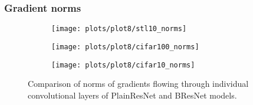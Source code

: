     \subsubsection*{Gradient norms}
    \begin{figure}[h!]
        \centering
        \begin{subfigure}{0.7\textwidth}
            \texttt{[image: plots/plot8/stl10\_norms]}
        \end{subfigure}
        \begin{subfigure}{0.7\textwidth}
            \texttt{[image: plots/plot8/cifar100\_norms]}
        \end{subfigure}
        \begin{subfigure}{0.7\textwidth}
            \texttt{[image: plots/plot8/cifar10\_norms]}
        \end{subfigure}
        \caption{Comparison of norms of gradients flowing through individual
            convolutional layers of PlainResNet and BResNet models.}
        \label{fig:plot8}
    \end{figure}


